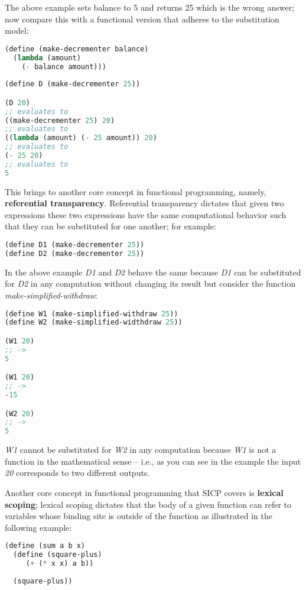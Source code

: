 \documentclass{amsbook}
\begin{document}
The above example sets balance to 5 and returns 25 which is the wrong answer; now compare this with a functional version that adheres to the substitution model:

\begin{lstlisting}[language=Lisp]
(define (make-decrementer balance)
  (lambda (amount)
    (- balance amount)))
    
(define D (make-decrementer 25))

(D 20)
;; evaluates to
((make-decrementer 25) 20)
;; evaluates to
((lambda (amount) (- 25 amount)) 20)
;; evaluates to
(- 25 20)
;; evaluates to
5
\end{lstlisting}

This brings to another core concept in functional programming, namely, \textbf{referential transparency}. Referential transparency dictates that given two expressions these two expressions have the same computational behavior such that they can be substituted for one another; for example:

\begin{lstlisting}[language=Lisp]
(define D1 (make-decrementer 25))
(define D2 (make-decrementer 25))
\end{lstlisting}

In the above example \textit{D1} and \textit{D2} behave the same because \textit{D1} can be substituted for \textit{D2} in any computation without changing its result but consider the function \textit{make-simplified-withdraw}:

\begin{lstlisting}[language=Lisp]
(define W1 (make-simplified-withdraw 25))
(define W2 (make-simplified-widthdraw 25))

(W1 20)
;; ->
5

(W1 20)
;; -> 
-15

(W2 20)
;; -> 
5
\end{lstlisting}

\textit{W1} cannot be substituted for \textit{W2} in any computation because \textit{W1} is not a function in the mathematical sense -- i.e., as you can see in the example the input \textit{20} corresponds to two different outputs.

Another core concept in functional programming that SICP covers is \textbf{lexical scoping}; lexical scoping dictates that the body of a given function can refer to variables whose binding site is outside of the function as illustrated in the following example:

\begin{lstlisting}[language=Lisp]
(define (sum a b x)
  (define (square-plus)
     (+ (* x x) a b))
     
  (square-plus))
\end{lstlisting}
\end{document}
